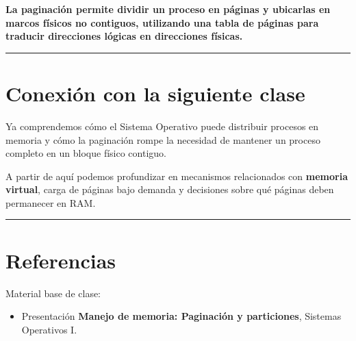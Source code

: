 \documentclass[
  spanish,
  letterpaper,
]{scrbook}
\providecommand{\tightlist}{%
  \setlength{\itemsep}{0pt}\setlength{\parskip}{0pt}}
\begin{document}
\begin{tcolorbox}[enhanced jigsaw, arc=.35mm, bottomrule=.15mm, bottomtitle=1mm, breakable, colback=white, colbacktitle=quarto-callout-note-color!10!white, colframe=quarto-callout-note-color-frame, coltitle=black, left=2mm, leftrule=.75mm, opacityback=0, opacitybacktitle=0.6, rightrule=.15mm, title=\textcolor{quarto-callout-note-color}{\faInfo}\hspace{0.5em}{Síntesis en una frase}, titlerule=0mm, toprule=.15mm, toptitle=1mm]

\textbf{La paginación permite dividir un proceso en páginas y ubicarlas
en marcos físicos no contiguos, utilizando una tabla de páginas para
traducir direcciones lógicas en direcciones físicas.}

\end{tcolorbox}

\begin{center}\rule{0.5\linewidth}{0.5pt}\end{center}


\chapter{Conexión con la siguiente
clase}\label{conexiuxf3n-con-la-siguiente-clase-2}

Ya comprendemos cómo el Sistema Operativo puede distribuir procesos en
memoria y cómo la paginación rompe la necesidad de mantener un proceso
completo en un bloque físico contiguo.

A partir de aquí podemos profundizar en mecanismos relacionados con
\textbf{memoria virtual}, carga de páginas bajo demanda y decisiones
sobre qué páginas deben permanecer en RAM.

\begin{center}\rule{0.5\linewidth}{0.5pt}\end{center}


\chapter{Referencias}\label{referencias-1}

Material base de clase:

\begin{itemize}
\tightlist
\item
  Presentación \textbf{Manejo de memoria: Paginación y particiones},
  Sistemas Operativos I.
\end{itemize}
\end{document}

